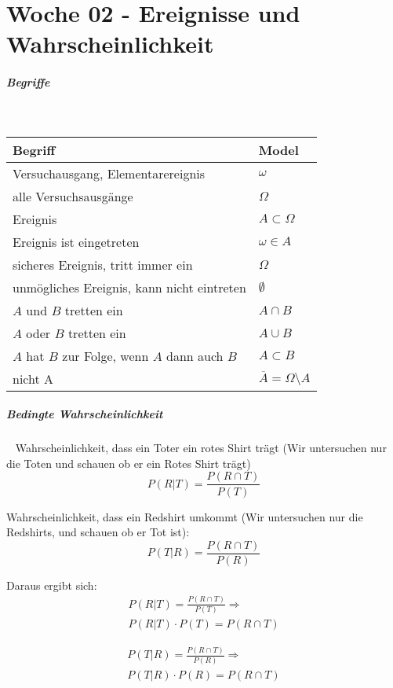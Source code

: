 \documentclass[11pt,twoside,landscape]{article}
\begin{document}
\section{Woche 02 - Ereignisse und Wahrscheinlichkeit}
\label{sec:orgbf0d7df}
\subparagraph{Begriffe} \
\label{sec:org4623ff2}
\begin{center}
\begin{tabular}{ll}
Begriff & Model\\[0pt]
\hline
Versuchausgang, Elementarereignis & \(\omega\)\\[0pt]
alle Versuchsausgänge & \(\Omega\)\\[0pt]
Ereignis & \(A \subset \Omega\)\\[0pt]
Ereignis ist eingetreten & \(\omega \in A\)\\[0pt]
sicheres Ereignis, tritt immer ein & \(\Omega\)\\[0pt]
unmögliches Ereignis, kann nicht eintreten & \(\emptyset\)\\[0pt]
\(A\) und \(B\) tretten ein & \(A \cap B\)\\[0pt]
\(A\) oder \(B\) tretten ein & \(A \cup B\)\\[0pt]
\(A\) hat \(B\) zur Folge, wenn \(A\) dann auch \(B\) & \(A \subset B\)\\[0pt]
nicht A & \(\overline{A} = \Omega \setminus A\)\\[0pt]
\end{tabular}
\end{center}
\subparagraph{Bedingte Wahrscheinlichkeit} \
\label{sec:orgae1f97c}
Wahrscheinlichkeit, dass ein Toter ein rotes Shirt trägt (Wir untersuchen nur die Toten und schauen ob er ein Rotes Shirt trägt)
\[
P(R|T) = \frac{P(R \cap T)}{P(T)}
\]

Wahrscheinlichkeit, dass ein Redshirt umkommt (Wir untersuchen nur die Redshirts, und schauen ob er Tot ist):
\[
P(T|R) = \frac{P(R \cap T)}{P(R)}
\]


Daraus ergibt sich:
\begin{equation}
\begin{split} \label{eqn:dead-has-red}
P(R|T) = \frac{P(R \cap T)}{P(T)} \Rightarrow \\
P(R|T) \cdot P(T) = P(R \cap T)
\end{split} 
\end{equation}

\begin{equation}
\begin{split} \label{eqn:red-is-dead}
P(T|R) = \frac{P(R \cap T)}{P(R)} \Rightarrow \\
P(T|R) \cdot P(R) = P(R \cap T)
\end{split} 
\end{equation}
\end{document}
